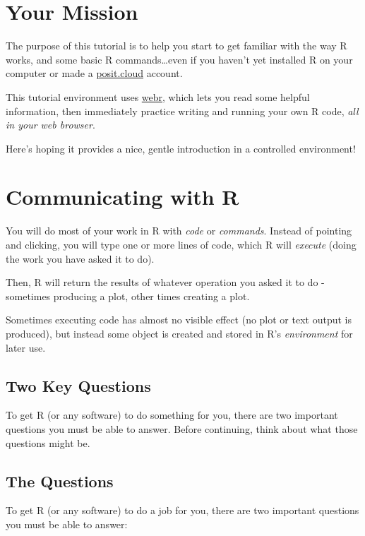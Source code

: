 \documentclass[
  letterpaper,
  DIV=11,
  numbers=noendperiod]{scrreprt}
\theoremstyle{remark}
\begin{document}
\section{Your Mission}\label{your-mission}

The purpose of this tutorial is to help you start to get familiar with
the way R works, and some basic R commands\ldots even if you haven't yet
installed R on your computer or made a
\href{https://posit.cloud}{posit.cloud} account.

This tutorial environment uses \hyperref[0]{webr}, which lets you read
some helpful information, then immediately practice writing and running
your own R code, \emph{all in your web browser}.

Here's hoping it provides a nice, gentle introduction in a controlled
environment!

\section{Communicating with R}\label{communicating-with-r}

You will do most of your work in R with \emph{code} or \emph{commands}.
Instead of pointing and clicking, you will type one or more lines of
code, which R will \emph{execute} (doing the work you have asked it to
do).

Then, R will return the results of whatever operation you asked it to do
- sometimes producing a plot, other times creating a plot.

Sometimes executing code has almost no visible effect (no plot or text
output is produced), but instead some object is created and stored in
R's \emph{environment} for later use.

\subsection{Two Key Questions}\label{two-key-questions}

To get R (or any software) to do something for you, there are two
important questions you must be able to answer. Before continuing, think
about what those questions might be.

\subsection{The Questions}\label{the-questions}

To get R (or any software) to do a job for you, there are two important
questions you must be able to answer:
\end{document}
